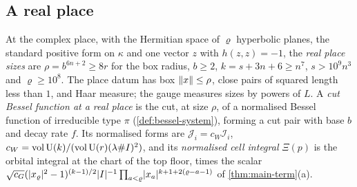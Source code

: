 \subsection{A real place}\label{ss:real-place}
At the complex place, with the Hermitian space of $\varrho$ hyperbolic planes, the standard positive form on $\kappa$ and one vector $z$ with $h(z,z)=-1$, the \emph{real place sizes} are $\rho=b^{6n+2}\ge8r$ for the
box radius, $b\ge2$, $k=s+3n+6\ge n^7$, $s>10^9n^3$ and $\varrho\ge10^8$. The place datum has box $\lVert x\rVert\le\rho$, close pairs of squared length less than $1$, and Haar measure; the gauge measures sizes by powers of $L$. A
\emph{cut Bessel function at a real place} is the cut, at size $\rho$, of a normalised Bessel function of irreducible type $\pi$ (\cref{def:bessel-system}), forming a cut pair with base $b$ and decay rate $f$. Its
normalised forms are $\mathcal J_i=c_W\mathcal I_i$, $c_W=\operatorname{vol}\operatorname{U}(k)/(\operatorname{vol}\operatorname{U}(r)(\lambda\#I)^2)$, and its \emph{normalised cell integral} $\Xi(p)$ is the orbital integral at the chart of the top floor, times the scalar
$\sqrt{c_G}(\lvert x_\varrho\rvert^2-1)^{(k-1)/2}\lvert I\rvert^{-1}\prod_{a<\varrho}\lvert x_a\rvert^{k+1+2(\varrho-a-1)}$ of \cref{thm:main-term}(a).
